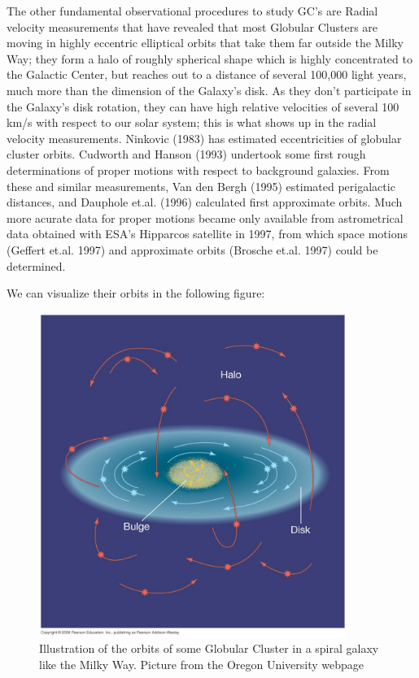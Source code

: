 The other fundamental observational procedures to study GC's are Radial velocity measurements that have revealed that most Globular Clusters are moving in highly eccentric elliptical orbits that take them far outside the Milky Way; they form a halo of roughly spherical shape which is highly concentrated to the Galactic Center, but reaches out to a distance of several 100,000 light years, much more than the dimension of the Galaxy's disk. As they don't participate in the Galaxy's disk rotation, they can have high relative velocities of several 100 km/s with respect to our solar system; this is what shows up in the radial velocity measurements. Ninkovic (1983) has estimated eccentricities of globular cluster orbits. Cudworth and Hanson (1993) undertook some first rough determinations of proper motions with respect to background galaxies. From these and similar measurements, Van den Bergh (1995) estimated perigalactic distances, and Dauphole et.al. (1996) calculated first approximate orbits. Much more acurate data for proper motions became only available from astrometrical data obtained with ESA's Hipparcos satellite in 1997, from which space motions (Geffert et.al. 1997) and approximate orbits (Brosche et.al. 1997) could be determined.

We can visualize their orbits in the following figure:

\begin{figure}[H]
\centering
\includegraphics[width=10cm]{images/orbits_gcs.jpg}
\caption[Illustration of the orbits of Globular Clusters around a spiral galaxy]{Illustration of the orbits of some Globular Cluster in a spiral galaxy like the Milky Way. Picture from the Oregon University webpage}
\end{figure}


